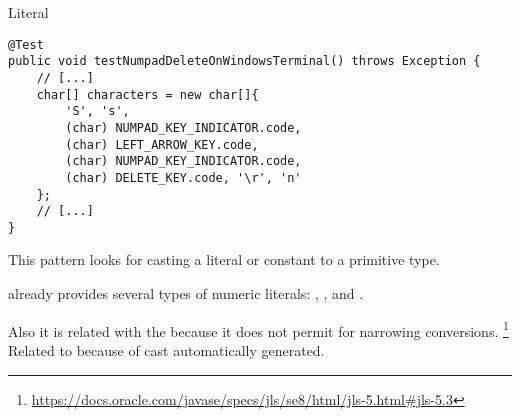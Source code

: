 \begin{pattern}{Literal}
\begin{verbatim}
@Test
public void testNumpadDeleteOnWindowsTerminal() throws Exception {
    // [...]
    char[] characters = new char[]{
        'S', 's',
        (char) NUMPAD_KEY_INDICATOR.code,
        (char) LEFT_ARROW_KEY.code,
        (char) NUMPAD_KEY_INDICATOR.code,
        (char) DELETE_KEY.code, '\r', 'n'
    };
    // [...]
}
\end{verbatim}

\detection{}
This pattern looks for casting a literal or constant to a primitive type.

\discussion{}
\java{} already provides several types of numeric literals:
, ,  and .

\related{}
Also it is related with the 
because it does not permit for narrowing conversions.%
\footnote{\url{https://docs.oracle.com/javase/specs/jls/se8/html/jls-5.html\#jls-5.3}}
Related to  because of cast automatically generated.
\end{pattern}